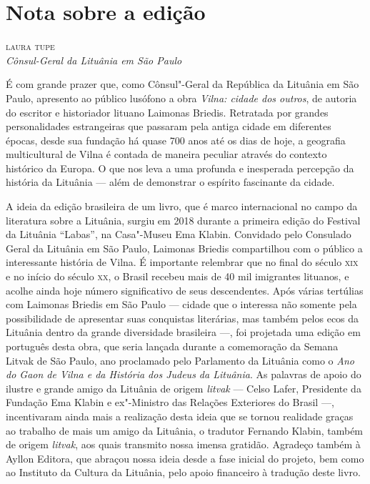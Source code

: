 \chapter[Nota sobre a edição, \emph{por Laura Tupe}]{Nota sobre a edição}

\begin{flushright}
\textsc{laura tupe}\\
\emph{Cônsul-Geral da Lituânia em São Paulo}
\end{flushright}

\noindent{}É com grande prazer que, como Cônsul"-Geral da República da Lituânia em
São Paulo, apresento ao público lusófono a obra \emph{Vilna: cidade dos
outros}, de autoria do escritor e historiador lituano Laimonas Briedis.
Retratada por grandes personalidades estrangeiras que passaram pela
antiga cidade em diferentes épocas, desde sua fundação há quase 700 anos
até os dias de hoje, a geografia multicultural de Vilna é contada
de maneira peculiar através do contexto histórico da Europa. O que nos
leva a uma profunda e inesperada percepção da história da Lituânia ---
além de demonstrar o espírito fascinante da cidade.

A ideia da edição brasileira de um livro, que é marco internacional no
campo da literatura sobre a Lituânia, surgiu em 2018 durante a primeira
edição do Festival da Lituânia ``Labas'', na Casa"-Museu Ema Klabin.
Convidado pelo Consulado Geral da Lituânia em São Paulo, Laimonas
Briedis compartilhou com o público a interessante história de Vilna. É
importante relembrar que no final do século \textsc{xix} e no início do século
\textsc{xx}, o Brasil recebeu mais de 40 mil imigrantes lituanos, e acolhe ainda
hoje número significativo de seus descendentes. Após várias tertúlias
com Laimonas Briedis em São Paulo --- cidade que o interessa não somente
pela possibilidade de apresentar suas conquistas literárias, mas também
pelos ecos da Lituânia dentro da grande diversidade brasileira ---, foi
projetada uma edição em português desta obra, que seria lançada durante
a comemoração da Semana Litvak de São Paulo, ano proclamado pelo
Parlamento da Lituânia como o \emph{Ano do Gaon de Vilna e da História
dos Judeus da Lituânia}. As palavras de apoio do ilustre e grande amigo
da Lituânia de origem \emph{litvak} --- Celso Lafer, Presidente da
Fundação Ema Klabin e ex"-Ministro das Relações Exteriores do Brasil ---,
incentivaram ainda mais a realização desta ideia que se tornou realidade
graças ao trabalho de mais um amigo da Lituânia, o tradutor Fernando
Klabin, também de origem \emph{litvak}, aos quais transmito nossa imensa
gratidão. Agradeço também à Ayllon Editora, que abraçou nossa ideia
desde a fase inicial do projeto, bem como ao Instituto da Cultura da
Lituânia, pelo apoio financeiro à tradução deste livro.

